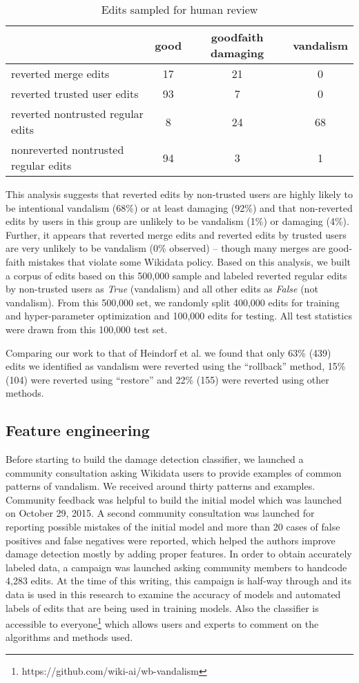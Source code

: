 \documentclass{sig-alternate}
\begin{document}
\begin{table*}
\centering
\caption{Edits sampled for human review}
\begin{tabular}{l|c|c|c} \hline
& good & good\-faith damaging & vandalism \\ \hline
reverted merge edits & 17 & 21 & 0 \\ \hline
reverted trusted user edits & 93 & 7 & 0 \\ \hline
reverted non\-trusted regular edits & 8 & 24 & 68 \\ \hline
non\-reverted non\-trusted regular edits & 94 & 3 & 1
\end{tabular}
\end{table*}
This analysis suggests that reverted edits by non-trusted users are highly likely to be intentional vandalism (68\%) or at least damaging (92\%) and that non-reverted edits by users in this group are unlikely to be vandalism (1\%) or damaging (4\%).  Further, it appears that reverted merge edits and reverted edits by trusted users are very unlikely to be vandalism (0\% observed) – though many merges are good-faith mistakes that violate some Wikidata policy. Based on this analysis, we built a corpus of edits based on this 500,000 sample and labeled reverted regular edits by non-trusted users as \textit{True} (vandalism) and all other edits as \textit{False} (not vandalism). From this 500,000 set, we randomly split 400,000 edits for training and hyper-parameter optimization and 100,000 edits for testing. All test statistics were drawn from this 100,000 test set.

Comparing our work to that of Heindorf et al.\cite{heindorf:towards} we found that only 63\% (439) edits we identified as vandalism were reverted using the ``rollback'' method, 15\% (104) were reverted using ``restore'' and 22\% (155) were reverted using other methods.

\subsection{Feature engineering}
Before starting to build the damage detection classifier, we launched a community consultation asking Wikidata users to provide examples of common patterns of vandalism. We received around thirty patterns and examples. Community feedback was helpful to build the initial model which was launched on October 29, 2015. A second community consultation was launched for reporting possible mistakes of the initial model and more than 20 cases of false positives and false negatives were reported, which helped the authors improve damage detection mostly by adding proper features. In order to obtain accurately labeled data, a campaign was launched asking community members to handcode 4,283 edits. At the time of this writing, this campaign is half-way through and its data is used in this research to examine the accuracy of models and automated labels of edits that are being used in training models. Also the classifier is accessible to everyone\footnote{https://github.com/wiki-ai/wb-vandalism} which allows users and experts to comment on the algorithms and methods used.
\end{document}
